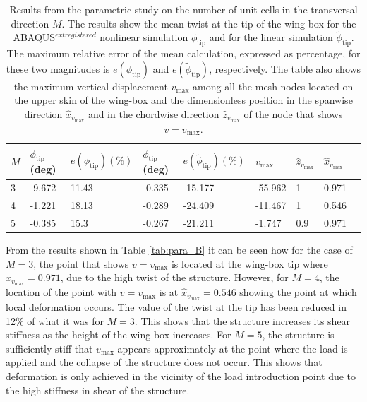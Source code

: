     \begin{table}[!htpb] %
      \centering
      \begin{tabular}{|l|l|l|l|l|l|l|l|l|}
      \hline
      $M$ & $\phi_{\mathrm{tip}}$ (deg) & $e(\phi_{\mathrm{tip}}) (\%)$ & $\tilde{\phi}_{\mathrm{tip}}$ (deg) & $e(\tilde{\phi}_{\mathrm{tip}}) (\%)$ & $v_{\mathrm{max}}$ & $\hat{z}_{v_{\mathrm{max}}}$ & $\hat{x}_{v_{\mathrm{max}}}$ \\ \hline
      3 & -9.672 & 11.43 & -0.335 & -15.177 & -55.962 & 1   & 0.971 \\ \hline
      4 & -1.221 & 18.13 & -0.289 & -24.409 & -11.467 & 1   & 0.546 \\ \hline
      5 & -0.385 & 15.3  & -0.267 & -21.211 & -1.747  & 0.9 & 0.971 \\ \hline
      \end{tabular}
      \caption[Results from the parametric study on the number of unit cells in the transversal direction]{Results from the parametric study on the number of unit cells in the transversal direction $M$. The results show the mean twist at the tip of the wing-box for the ABAQUS$^{	extregistered}$ nonlinear simulation $\phi_{\mathrm{tip}}$ and for the linear simulation $\tilde{\phi}_{\mathrm{tip}}$. The maximum relative error of the mean calculation, expressed as percentage, for these two magnitudes is $e(\phi_{\mathrm{tip}})$ and $e(\tilde{\phi}_{\mathrm{tip}})$, respectively. The table also shows the maximum vertical displacement $v_{\mathrm{max}}$ among all the mesh nodes located on the upper skin of the wing-box and the dimensionless position in the spanwise direction $\hat{x}_{v_{\mathrm{max}}}$ and in the chordwise direction $\hat{z}_{v_{\mathrm{max}}}$ of the node that shows $v = v_{\mathrm{max}}$.}
      \label{tab:para_M}
    \end{table}

    From the results shown in Table \ref{tab:para_B} it can be seen how for the case of $M = 3$, the point that shows $v = v_{\mathrm{max}}$ is located at the wing-box tip where $\hat{x}_{v_{\mathrm{max}}} = 0.971$, due to the high twist of the structure. However, for $M = 4$, the location of the point with $v = v_{\mathrm{max}}$ is at $\hat{x}_{v_{\mathrm{max}}} = 0.546$ showing the point at which local deformation occurs. The value of the twist at the tip \phinonlin has been reduced in 12\% of what it was for $M = 3$. This shows that the structure increases its shear stiffness as the height of the wing-box increases. For $M = 5$, the structure is sufficiently stiff that $v_{\mathrm{max}}$ appears approximately at the point where the load is applied and the collapse of the structure does not occur. This shows that deformation is only achieved in the vicinity of the load introduction point due to the high stiffness in shear of the structure.

